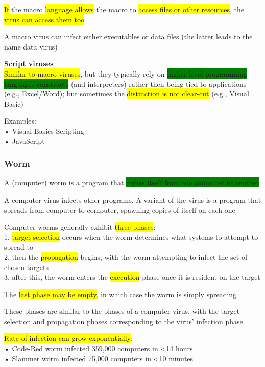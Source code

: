 \documentclass[]{project_plan}
\begin{document}
\colorbox{yellow}{If} the macro \colorbox{yellow}{language allows} the macro to \colorbox{yellow}{access files or other resources}, the \colorbox{yellow}{virus
  can access them too}

A macro virus can infect either executables or data files (the latter leads to the name
data virus)

\textbf{Script viruses}\\
\colorbox{yellow}{Similar to macro viruses}, but they typically rely on \colorbox{green}{higher level programming
  languages constructs} (and interpreters) rather then being tied to applications (e.g.,
Excel/Word); but sometimes the \colorbox{yellow}{distinction is not clear-cut} (e.g., Visual Basic)

Examples:\\
• Visual Basics Scripting\\
• JavaScript

\subsubsection{Worm}

A (computer) worm is a program that \colorbox{green}{copies itself from one computer to another}

A computer virus infects other programs. A variant of the virus is a program that spreads from computer
to computer, spawning copies of itself on each one

Computer worms generally exhibit \colorbox{yellow}{three phases}:\\
1. \colorbox{yellow}{target selection} occurs when the worm determines what systems to attempt to spread to\\
2. then the \colorbox{yellow}{propagation} begins, with the worm attempting to infect the set of chosen targets\\
3. after this, the worm enters the \colorbox{yellow}{execution} phase once it is resident on the target

The \colorbox{yellow}{last phase may be empty}, in which case the worm is simply spreading

These phases are similar to the phases of a
computer virus, with the target selection and
propagation phases corresponding to the
virus’ infection phase

\colorbox{yellow}{Rate of infection can grow exponentially}:\\
• Code-Red worm infected 359,000 computers in \textless 14 hours\\
• Slammer worm infected 75,000 computers in \textless 10 minutes
\end{document}

